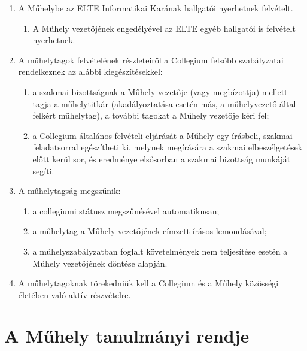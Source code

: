 \documentclass{../styles/rulebook}
\begin{document}
\begin{enumerate}
	\item A Műhelybe az ELTE Informatikai Karának hallgatói nyerhetnek felvételt.
	      \begin{enumerate}
		      \item A Műhely vezetőjének engedélyével az ELTE egyéb hallgatói is felvételt nyerhetnek.
	      \end{enumerate}
	\item A műhelytagok felvételének részleteiről a Collegium felsőbb szabályzatai rendelkeznek az alábbi kiegészítésekkel:
	      \begin{enumerate}
		      \item a szakmai bizottságnak a Műhely vezetője (vagy megbízottja) mellett tagja a műhelytitkár (akadályoztatása esetén más, a műhelyvezető által felkért műhelytag), a további tagokat a Műhely vezetője kéri fel;
		      \item a Collegium általános felvételi eljárását a Műhely egy írásbeli, szakmai feladatsorral egészítheti ki, melynek megírására a szakmai elbeszélgetések előtt kerül sor, és eredménye elsősorban a szakmai bizottság munkáját segíti.
	      \end{enumerate}
	\item A műhelytagság megszűnik:
	      \begin{enumerate}
		      \item a collegiumi státusz megszűnésével automatikusan;
		      \item a műhelytag a Műhely vezetőjének címzett írásos lemondásával;
		      \item a műhelyszabályzatban foglalt követelmények nem teljesítése esetén a Műhely vezetőjének döntése alapján.
	      \end{enumerate}
	\item A műhelytagoknak törekedniük kell a Collegium és a Műhely közösségi életében való aktív részvételre.
\end{enumerate}

\section{A Műhely tanulmányi rendje}
\end{document}

